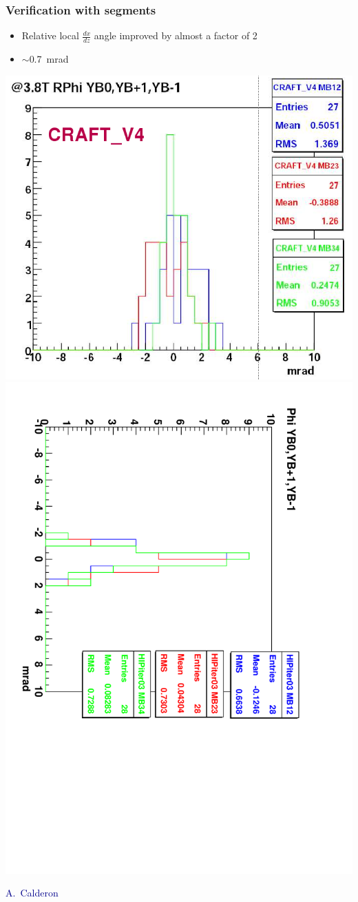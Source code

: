 \documentclass[compress]{beamer}
\begin{document}
\begin{frame}
\frametitle{Verification with segments}
\begin{itemize}
\item Relative local $\frac{dx}{dz}$ angle improved by almost a factor of 2
\item $\sim$0.7~mrad
\end{itemize}

\vfill\includegraphics[width=0.5\linewidth]{alicia_v4_phiy.png}\includegraphics[height=0.5\linewidth, angle=90]{Phires_YB0YB1YBm1_HIPiter03_InOut_38T-1.pdf}

\hfill \scriptsize \textcolor{darkblue}{A.~Calderon}
\end{frame}

\end{document}
